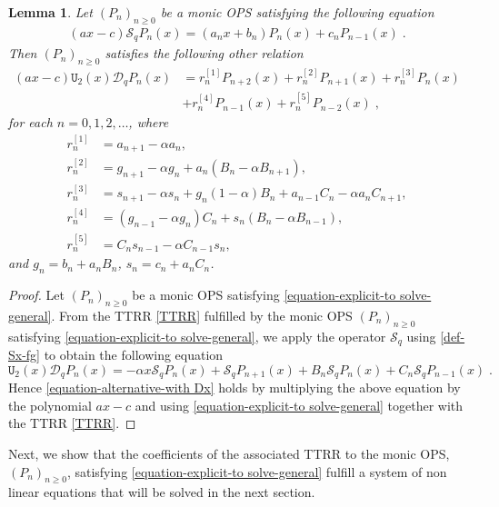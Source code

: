 \documentclass{amsart}
\newtheorem{lemma}[theorem]{Lemma}
\theoremstyle{remark}
\numberwithin{equation}{section}
\begin{document}
\begin{lemma}\label{lemma-for-alternative-relation}
Let $(P_n)_{n\geq0}$ be a monic OPS satisfying the following equation
\begin{align}\label{equation-explicit-to solve-general}
(ax-c)\mathcal{S}_qP_n(x)=(a_nx+b_n)P_n(x)+c_nP_{n-1}(x)\;.
\end{align}
Then $(P_n)_{n\geq 0}$ satisfies the following other relation
\begin{align}\label{equation-alternative-with Dx}
(ax-c)\mathtt{U}_2(x) \mathcal{D}_q P_n (x)&=r_n ^{[1]} P_{n+2}(x)+r_n ^{[2]} P_{n+1}(x)+r_n ^{[3]}P_n (x)\\
&+r_n ^{[4]}P_{n-1}(x)+r_n ^{[5]}P_{n-2}(x)\;, \nonumber
\end{align}
for each $n=0,1,2,\ldots$, where
\begin{align*}
r_n ^{[1]}&= a_{n+1}-\alpha a_n,\\
 r_n ^{[2]}&= g_{n+1}-\alpha g_n+a_n(B_n-\alpha B_{n+1}),\\
r_n ^{[3]}&= s_{n+1}-\alpha s_n+g_n(1-\alpha) B_{n}+a_{n-1}C_n-\alpha a_nC_{n+1},\\
r_n ^{[4]}&= (g_{n-1}-\alpha g_n)C_{n}+s_n(B_n-\alpha B_{n-1}),\\
 r_n ^{[5]}&= C_ns_{n-1}-\alpha C_{n-1}s_n,
\end{align*}
and $g_n =b_n +a_n B_n$, $s_n =c_n +a_n C_n$.
\end{lemma}
\begin{proof}
Let $(P_n)_{n\geq0}$ be a monic OPS satisfying \eqref{equation-explicit-to solve-general}.
From the TTRR \eqref{TTRR} fulfilled by the monic OPS $(P_n)_{n\geq 0}$ satisfying \eqref{equation-explicit-to solve-general}, we apply the operator $\mathcal{S}_q$ using \eqref{def-Sx-fg} to obtain the following equation
$$\mathtt{U}_2(x)\mathcal{D}_qP_n(x)=-\alpha x\mathcal{S}_qP_n(x)+\mathcal{S}_qP_{n+1}(x)+B_n\mathcal{S}_qP_n(x)+C_n\mathcal{S}_qP_{n-1}(x)\;.$$
Hence \eqref{equation-alternative-with Dx} holds by multiplying the above equation by the polynomial $ax-c$ and using \eqref{equation-explicit-to solve-general} together with the TTRR \eqref{TTRR}. 
\end{proof}

Next, we show that the coefficients of the associated TTRR to the monic OPS, $(P_n)_{n\geq 0}$, satisfying \eqref{equation-explicit-to solve-general}  fulfill a system of non linear equations that will be solved in the next section.
\end{document}
